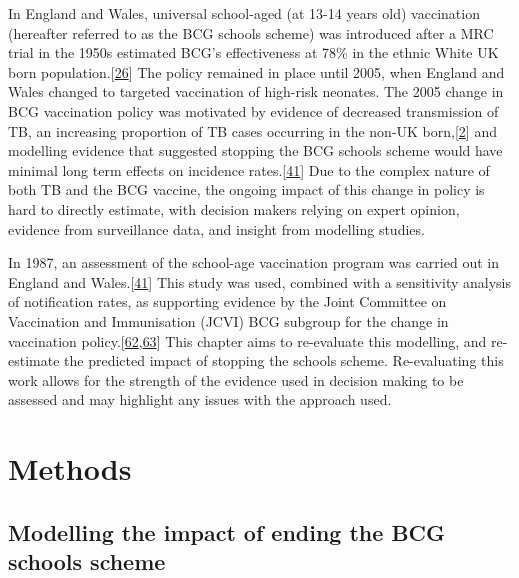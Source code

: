 \documentclass[11pt,twoside]{bristolthesis}
\begin{document}
  In England and Wales, universal school-aged (at 13-14 years old) vaccination (hereafter referred to as the BCG schools scheme) was introduced after a MRC trial in the 1950s estimated BCG's effectiveness at 78\% in the ethnic White UK born population.{[}\protect\hyperlink{ref-Hart1972}{26}{]} The policy remained in place until 2005, when England and Wales changed to targeted vaccination of high-risk neonates. The 2005 change in BCG vaccination policy was motivated by evidence of decreased transmission of TB, an increasing proportion of TB cases occurring in the non-UK born,{[}\protect\hyperlink{ref-PHE2017}{2}{]} and modelling evidence that suggested stopping the BCG schools scheme would have minimal long term effects on incidence rates.{[}\protect\hyperlink{ref-Sutherland1989}{41}{]} Due to the complex nature of both TB and the BCG vaccine, the ongoing impact of this change in policy is hard to directly estimate, with decision makers relying on expert opinion, evidence from surveillance data, and insight from modelling studies.
  
  In 1987, an assessment of the school-age vaccination program was carried out in England and Wales.{[}\protect\hyperlink{ref-Sutherland1989}{41}{]} This study was used, combined with a sensitivity analysis of notification rates, as supporting evidence by the Joint Committee on Vaccination and Immunisation (JCVI) BCG subgroup for the change in vaccination policy.{[}\protect\hyperlink{ref-JVCIBCG2002}{62},\protect\hyperlink{ref-JVCIBCG2003}{63}{]} This chapter aims to re-evaluate this modelling, and re-estimate the predicted impact of stopping the schools scheme. Re-evaluating this work allows for the strength of the evidence used in decision making to be assessed and may highlight any issues with the approach used.
  
  \hypertarget{methods}{%
  \section{Methods}\label{methods}}
  
  \hypertarget{modelling-the-impact-of-ending-the-bcg-schools-scheme}{%
  \subsection{Modelling the impact of ending the BCG schools scheme}\label{modelling-the-impact-of-ending-the-bcg-schools-scheme}}
  
\end{document}
